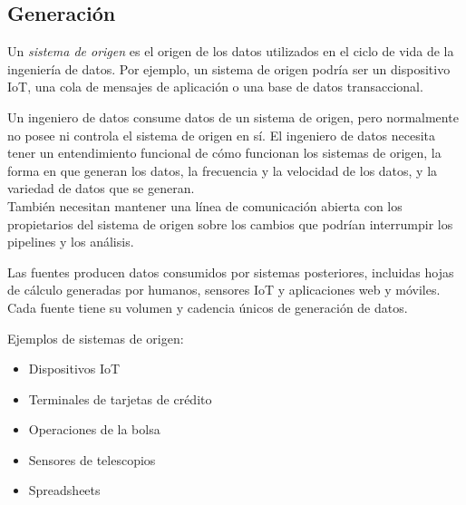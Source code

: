 \documentclass[12pt]{book}
\begin{document}
\subsection{Generación}
Un \textit{sistema de origen} es el origen de los datos utilizados en el ciclo de vida de la ingeniería de datos. Por ejemplo, un sistema de origen podría ser un dispositivo IoT, una cola de mensajes de aplicación o una base de datos transaccional.

Un ingeniero de datos consume datos de un sistema de origen, pero normalmente no posee ni controla el sistema de origen en sí. El ingeniero de datos necesita tener un entendimiento funcional de cómo funcionan los sistemas de origen, la forma en que generan los datos, la frecuencia y la velocidad de los datos, y la variedad de datos que se generan.\\
También necesitan mantener una línea de comunicación abierta con los propietarios del sistema de origen sobre los cambios que podrían interrumpir los pipelines y los análisis.

Las fuentes producen datos consumidos por sistemas posteriores, incluidas hojas de cálculo generadas por humanos, sensores IoT y aplicaciones web y móviles. Cada fuente tiene su volumen y cadencia únicos de generación de datos.

Ejemplos de sistemas de origen: 
\begin{itemize}
    \item Dispositivos IoT
    \item Terminales de tarjetas de crédito
    \item Operaciones de la bolsa
    \item Sensores de telescopios
    \item Spreadsheets
\end{itemize}
\end{document}
